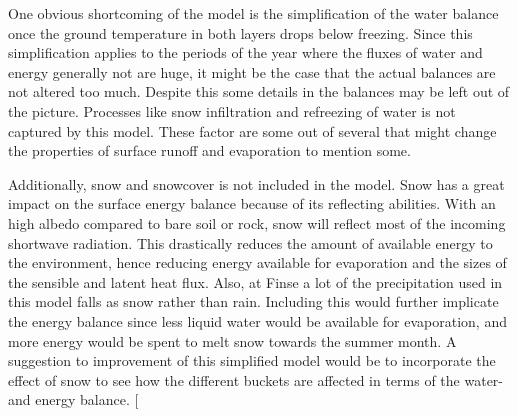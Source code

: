 \documentclass[a4paper,11pt,twocolumn]{article}
\begin{document}
One obvious shortcoming of the model is the simplification of the water balance once the ground temperature in both layers drops below freezing. Since this simplification applies to the periods of the year where the fluxes of water and energy generally not are huge, it might be the case that the actual balances are not altered too much. Despite this some details in the balances may be left out of the picture. Processes like snow infiltration and refreezing of water is not captured by this model. These factor are some out of several that might change the properties of surface runoff and evaporation to mention some. 

Additionally, snow and snowcover is not included in the model. Snow has a great impact on the surface energy balance because of its reflecting abilities. With an high albedo compared to bare soil or rock, snow will reflect most of the incoming shortwave radiation. This drastically reduces the amount of available energy to the environment, hence reducing energy available for evaporation and the sizes of the sensible and latent heat flux. Also, at Finse a lot of the precipitation used in this model falls as snow rather than rain. Including this would further implicate the energy balance since less liquid water would be available for evaporation, and more energy would be spent to melt snow towards the summer month. A suggestion to improvement of this simplified model would be to incorporate the effect of snow to see how the different buckets are affected in terms of the water- and energy balance.
\twocolumn
[
\end{document}
